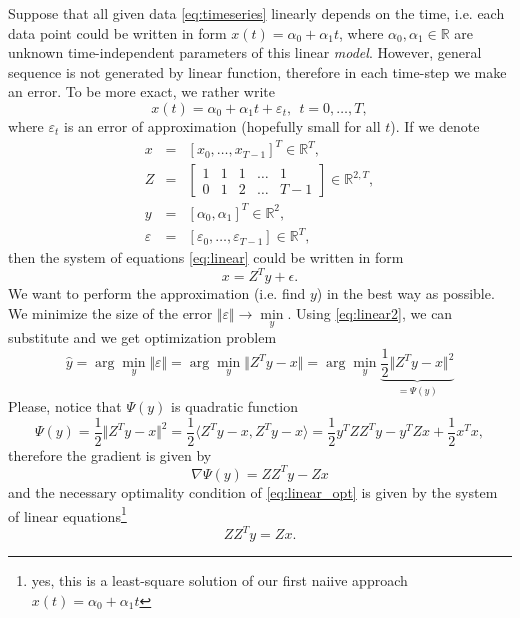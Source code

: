 \documentclass{article}
\begin{document}
 Suppose that all given data \eqref{eq:timeseries} linearly depends on the time, i.e. each data point could be written in form $x(t) = \alpha_0 + \alpha_1 t$, where $\alpha_0,\alpha_1 \in \mathbb{R}$ are unknown time-independent parameters of this linear \emph{model}. 
 However, general sequence is not generated by linear function, therefore in each time-step we make an error. To be more exact, we rather write
 \begin{equation}
  \label{eq:linear}
  x(t) = \alpha_0 + \alpha_1 t + \varepsilon_t, ~~t = 0,\dots,T,
 \end{equation}
 where $\varepsilon_t$ is an error of approximation (hopefully small for all $t$). 
 If we denote 
 \begin{displaymath}
  \begin{array}{rcl}
   x & = & [x_0, \dots, x_{T-1}]^T \in \mathbb{R}^T, \\[5mm]
   Z & = & \left[
    \begin{array}{ccccc}
     1 & 1 & 1 & \dots & 1 \\
     0 & 1 & 2 & \dots & T-1
    \end{array} 
     \right] \in \mathbb{R}^{2,T}, \\[5mm]
   y & = & [\alpha_0,\alpha_1]^T \in \mathbb{R}^2, \\[5mm]
   \varepsilon & = & [\varepsilon_0,\dots,\varepsilon_{T-1}] \in \mathbb{R}^T,
  \end{array}
 \end{displaymath}
 then the system of equations \eqref{eq:linear} could be written in form
 \begin{equation}
  \label{eq:linear2}
  x = Z^T y + \epsilon.
 \end{equation}
 We want to perform the approximation (i.e. find $y$) in the best way as possible. We minimize the size of the error $\Vert \varepsilon \Vert \rightarrow \min\limits_{y}$. 
 Using \eqref{eq:linear2}, we can substitute and we get optimization problem
 \begin{equation}
  \label{eq:linear_opt}
  \hat{y} = \arg\min\limits_{y} \Vert \varepsilon \Vert  = \arg\min\limits_{y} \Vert Z^T y - x \Vert = \arg\min\limits_{y} \underbrace{\frac{1}{2}\Vert Z^T y - x \Vert^2}_{ = \Psi(y)}  
 \end{equation}
 Please, notice that $\Psi(y)$ is quadratic function
 \begin{displaymath}
  \Psi(y) = \frac{1}{2}\Vert Z^T y - x \Vert^2 = \frac{1}{2}\langle Z^T y - x, Z^T y - x \rangle = \frac{1}{2}y^T Z Z^T y - y^T Z x + \frac{1}{2}x^T x,
 \end{displaymath}
 therefore the gradient is given by
 \begin{displaymath}
  \nabla \Psi(y) = ZZ^T y - Z x
 \end{displaymath}
 and the necessary optimality condition of \eqref{eq:linear_opt} is given by the system of linear equations\footnote{yes, this is a least-square solution of our first naiive approach $x(t) = \alpha_0 + \alpha_1 t$}
 \begin{displaymath}
  ZZ^T y = Zx .
 \end{displaymath}
\end{document}

